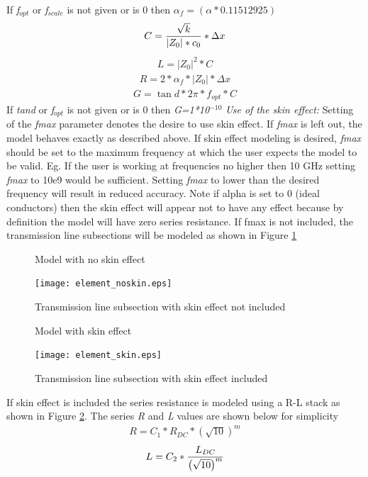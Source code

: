 \documentclass{article}
\begin{document}
{\begin{eqnarray}
\end{eqnarray}
If \emph{f$_{opt}$} or \emph{f$_{scale}$} is not given or is 0 then $\alpha _f  = \left( {\alpha *0.11512925} \right)$
%
\begin{eqnarray}
\label{C} 
C = {{\sqrt k } \over {\left| {Z_0 } \right|*c_0 }}*\Delta x
\end{eqnarray}
%
\begin{eqnarray}
\label{L} 
L = \left| {Z_0 } \right|^2 *C
\end{eqnarray}
%
\begin{eqnarray}
\label{R} 
R = 2*\alpha _f *\left| {Z_0 } \right|*\Delta x
\end{eqnarray}
%
\begin{eqnarray}
\label{G} 
G = \tan d*2\pi *f_{opt} *C
\end{eqnarray}
If \emph{tand} or \emph{f$_{opt}$} is not given or is 0 then \emph{G=1*10$^{-10}$}
\newline
\myThickLine
\textit{Use of the skin effect:}
\newline
Setting of the \emph{fmax} parameter denotes the desire to use skin effect.  If \emph{fmax} is left out, the model behaves exactly as described above.  If skin effect modeling is desired, \emph{fmax} should be set to the maximum frequency at which the user expects the model to be valid.  Eg.  If the user is working at frequencies no higher then 10 GHz setting \emph{fmax} to 10e9 would be sufficient.  Setting \emph{fmax} to lower than the desired frequency will result in reduced accuracy.  Note if alpha is set to 0 (ideal conductors) then the skin effect will appear not to have any effect because by definition the model will have zero series resistance.  If fmax is not included, the transmission line subsections will be modeled as shown in Figure \ref{element_noskin}
\begin{figure}[h]
\centerline{Model with no skin effect}
\centerline{\texttt{[image: element\_noskin.eps]}} \caption{Transmission line subsection with skin effect not included
\label{element_noskin}}
\end{figure}
\vfill\eject
\begin{figure}[h]
\centerline{Model with skin effect}
\centerline{\texttt{[image: element\_skin.eps]}} \caption{Transmission line subsection with skin effect included
\label{element_skin}}
\end{figure}
\hspace*{\fill}
%
If skin effect is included the series resistance is modeled using a R-L stack as shown in Figure \ref{element_skin}.  The series \emph{R} and \emph{L} values are shown below for simplicity
\begin{eqnarray}
\label{Rseries} 
R = C_1 *R_{DC} *\left( {\sqrt {10} } \right)^m 
\end{eqnarray}
\begin{eqnarray}
\label{Lseries} 
L = C_2 *{{L_{DC} } \over {\left( {\sqrt {10} } \right)^m }}
\end{eqnarray}

}
\end{document}
